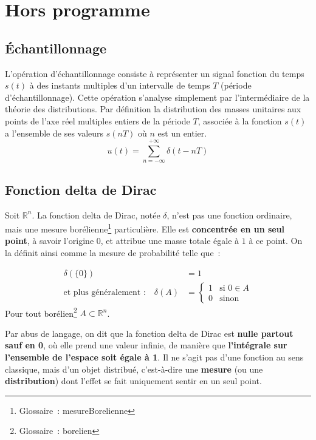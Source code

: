 \chapter{Hors programme}\label{chapHorsProgramme}

\section{Échantillonnage}\label{hpEchantillonnage}

L’opération d’échantillonnage consiste à représenter un signal fonction du temps 
\(s(t)\) \`a des instants multiples d’un intervalle de temps \(T\) (p\'eriode d’échantillonnage).
Cette op\'eration s'analyse simplement par l’intermédiaire de la th\'eorie des distributions.
Par définition la distribution des masses unitaires aux points de l'axe r\'eel multiples 
entiers de la période \(T\), associée à la fonction \(s(t)\) a l'ensemble de ses valeurs
\(s(nT)\) o\`u \(n\) est un entier.
\[
    u(t) = \sum_{n=-\infty}^{+\infty} \delta(t - nT)
\]

\section{Fonction delta de Dirac}
\label{secDirac}

Soit $\mathbb{R}^n$. La fonction delta de Dirac, notée $\delta$, n’est pas 
une fonction ordinaire, mais une mesure borélienne\footnote{Glossaire~: \gls{mesureBorelienne}} particulière. Elle est 
\textbf{concentrée en un seul point}, à savoir l’origine $0$, et attribue une 
masse totale égale à $1$ à ce point. On la définit ainsi comme la mesure de 
probabilité telle que~:

\begin{align*}
    \delta(\{0\})  &= 1\\
    \text{et plus généralement~:} \quad \delta(A) &=
    \begin{cases}
        1 & \text{si } 0 \in A \\
        0 & \text{sinon}
    \end{cases}
\end{align*}
Pour tout borélien\footnote{Glossaire~: \gls{borelien}} \(A \subset \mathbb{R}^n\).

Par abus de langage, on dit que la fonction delta de Dirac est 
\textbf{nulle partout sauf en 0}, où elle prend une valeur infinie, de manière que 
\textbf{l’intégrale sur l’ensemble de l’espace soit égale à 1}. Il ne 
s’agit pas d’une fonction au sens classique, mais d’un objet distribué, 
c’est-à-dire une \textbf{mesure} (ou une \textbf{distribution}) dont l’effet se 
fait uniquement sentir en un seul point.

